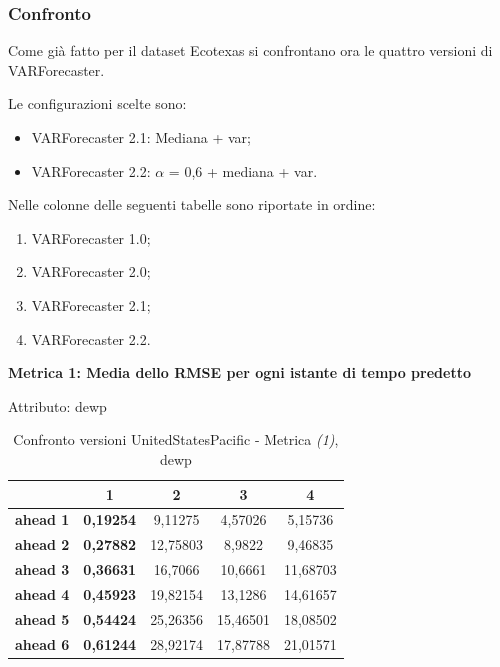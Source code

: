 \documentclass[12pt,a4paper,oneside,openright]{book}
\begin{document}
\newpage
\subsubsection{Confronto}
Come già fatto per il dataset Ecotexas si confrontano ora le quattro versioni di VARForecaster.

Le configurazioni scelte sono:
\begin{itemize}
\item VARForecaster 2.1: Mediana + var;
\item VARForecaster 2.2: $\alpha$ = 0,6 + mediana + var.
\end{itemize}

Nelle colonne delle seguenti tabelle sono riportate in ordine:
\begin{enumerate}
\item VARForecaster 1.0;
\item VARForecaster 2.0;
\item VARForecaster 2.1;
\item VARForecaster 2.2.
\end{enumerate}

\medskip

\textbf{Metrica 1: Media dello RMSE per ogni istante di tempo predetto} 

\medskip

Attributo: dewp \\ 

\begin{table}[H]
\centering
\begin{tabular}{|c|c|c|c|c|}
\hline
& 1 & 2 & 3 & 4 \\
\hline
\textbf{ahead 1} & \textbf{0,19254} & 9,11275 & 4,57026 & 5,15736\\
\hline
\textbf{ahead 2} & \textbf{0,27882} & 12,75803 & 8,9822 & 9,46835\\
\hline
\textbf{ahead 3} & \textbf{0,36631} & 16,7066 & 10,6661 & 11,68703\\
\hline
\textbf{ahead 4} & \textbf{0,45923} & 19,82154 & 13,1286 & 14,61657\\
\hline
\textbf{ahead 5} & \textbf{0,54424} & 25,26356 & 15,46501& 18,08502\\
\hline
\textbf{ahead 6} & \textbf{0,61244} & 28,92174 & 17,87788 & 21,01571\\
\hline
\end{tabular} \\
\caption{Confronto versioni UnitedStatesPacific - Metrica \textit{(1)}, dewp}
\end{table} 
\end{document}
